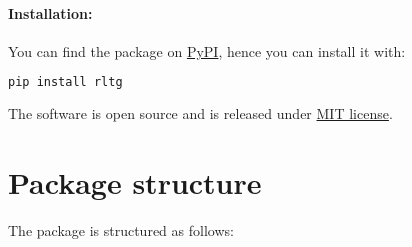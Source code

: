 \paragraph{Installation:} You can find the package on \href{https://pypi.org/project/rltg/}{PyPI}, hence you can install it with:
\begin{lstlisting}[language=bash]
pip install rltg
\end{lstlisting}

The software is open source and is released under \href{https://github.com/MarcoFavorito/rltg/blob/master/LICENSE}{MIT license}.

\section{Package structure}
The package is structured as follows:
